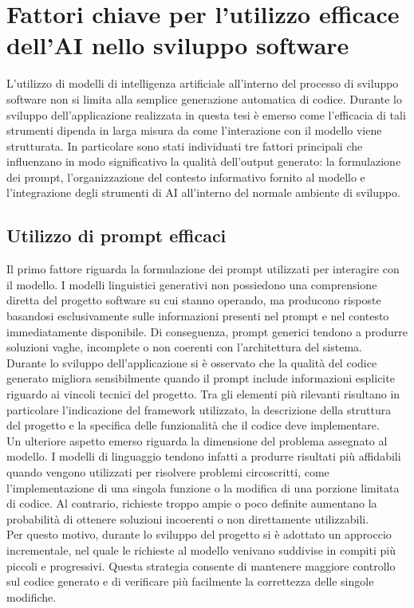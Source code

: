 \chapter{Fattori chiave per l'utilizzo efficace dell'AI nello sviluppo software}

L'utilizzo di modelli di intelligenza artificiale all'interno del processo di sviluppo software non si limita alla semplice generazione automatica di codice. Durante lo sviluppo dell'applicazione realizzata in questa tesi è emerso come l'efficacia di tali strumenti dipenda in larga misura da come l'interazione con il modello viene strutturata. In particolare sono stati individuati tre fattori principali che influenzano in modo significativo la qualità dell'output generato: la formulazione dei prompt, l'organizzazione del contesto informativo fornito al modello e l'integrazione degli strumenti di AI all'interno del normale ambiente di sviluppo.

\section{Utilizzo di prompt efficaci}

Il primo fattore riguarda la formulazione dei prompt utilizzati per interagire con il modello. I modelli linguistici generativi non possiedono una comprensione diretta del progetto software su cui stanno operando, ma producono risposte basandosi esclusivamente sulle informazioni presenti nel prompt e nel contesto immediatamente disponibile. Di conseguenza, prompt generici tendono a produrre soluzioni vaghe, incomplete o non coerenti con l'architettura del sistema.
\\
Durante lo sviluppo dell'applicazione si è osservato che la qualità del codice generato migliora sensibilmente quando il prompt include informazioni esplicite riguardo ai vincoli tecnici del progetto. Tra gli elementi più rilevanti risultano in particolare l'indicazione del framework utilizzato, la descrizione della struttura del progetto e la specifica delle funzionalità che il codice deve implementare.
\\
Un ulteriore aspetto emerso riguarda la dimensione del problema assegnato al modello. I modelli di linguaggio tendono infatti a produrre risultati più affidabili quando vengono utilizzati per risolvere problemi circoscritti, come l'implementazione di una singola funzione o la modifica di una porzione limitata di codice. Al contrario, richieste troppo ampie o poco definite aumentano la probabilità di ottenere soluzioni incoerenti o non direttamente utilizzabili.
\\
Per questo motivo, durante lo sviluppo del progetto si è adottato un approccio incrementale, nel quale le richieste al modello venivano suddivise in compiti più piccoli e progressivi. Questa strategia consente di mantenere maggiore controllo sul codice generato e di verificare più facilmente la correttezza delle singole modifiche.

